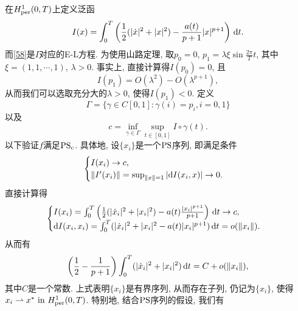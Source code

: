 \begin{example}
    在$H_{{\rm per}}^1(0, T)$上定义泛函 
    \begin{equation*}
        I(x) = \int_0^T\left(\frac{1}{2}(|\dot x|^2 + |x|^2) - \frac{a(t)}{p + 1}|x|^{p + 1}\right) \,{\rm d}t.
    \end{equation*}
    而\eqref{58}是$I$对应的E-L方程. 为使用山路定理, 取$p_0 = 0$, $p_1 = \lambda\xi\sin\frac{2\pi}{T}t$, 其中$\xi = (1, 1, \cdots, 1)$, $\lambda > 0$.
    事实上, 直接计算得$I(p_0) = 0$, 且 
    \begin{equation*}
        I(p_1) = O(\lambda^2) - O(\lambda^{p + 1}),
    \end{equation*}
    从而我们可以选取充分大的$\lambda > 0$, 使得$I(p_1) < 0$. 定义 
    \begin{equation*}
        \Gamma = \{\gamma \in C[0, 1]\colon \gamma(i) = p_i, i = 0, 1\}
    \end{equation*}
    以及 
    \begin{equation*}
        c = \inf_{\gamma \in \Gamma}\sup_{t \in [0, 1]}I \circ \gamma(t).
    \end{equation*}
    以下验证$f$满足${\rm PS_c}$. 具体地, 设$\{x_i\}$是一个${\rm PS}$序列, 即满足条件 
    \begin{equation*}
        \begin{cases}
            I(x_i) \rightarrow c, \\ 
            \Vert I'(x_i)\Vert = \sup_{\Vert x \Vert = 1}|{\rm d}I(x_i, x)| \rightarrow 0.
        \end{cases}
    \end{equation*}
    直接计算得 
    \begin{equation*}
        \begin{cases}
            I(x_i) = \int_0^T\left(\frac{1}{2}(|\dot x_i|^2 + |x_i|^2) - a(t)\frac{|x_i|^{p + 1}}{p + 1}\right) \,{\rm d}t \rightarrow c, \\
            {\rm d}I(x_i, x_i) = \int_0^T(|\dot x_i|^2 + |x_i|^2 - a(t)|x_i|^{p + 1}) \,{\rm d}t = o(\Vert x_i\Vert).
        \end{cases}
    \end{equation*}
    从而有
    \begin{equation*}
        \left(\frac{1}{2} - \frac{1}{p + 1}\right)\int_0^T(|\dot x_i|^2 + |x_i|^2) \,{\rm d}t = C + o(\Vert x_i \Vert),
    \end{equation*}
    其中$C$是一个常数. 上式表明$\{x_i\}$是有界序列, 从而存在子列, 仍记为$\{x_i\}$, 使得$x_i \rightharpoonup x^*\ {\rm in}\ H_{{\rm per}}^1(0, T)$.
    特别地, 结合${\rm PS}$序列的假设, 我们有 

\end{example}
